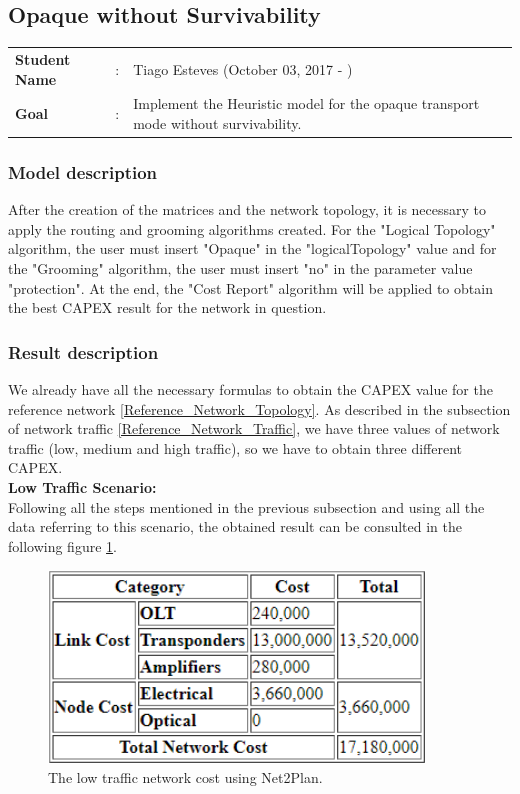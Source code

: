 \clearpage

\subsection{Opaque without Survivability}\label{heuristic_Opaque_Survivability}
\begin{tcolorbox}	
\begin{tabular}{p{2.75cm} p{0.2cm} p{10.5cm}} 	
\textbf{Student Name}  &:& Tiago Esteves    (October 03, 2017 - )\\
\textbf{Goal}          &:& Implement the Heuristic model for the opaque transport mode without survivability.
\end{tabular}
\end{tcolorbox}

\subsubsection{Model description}

After the creation of the matrices and the network topology, it is necessary to apply the routing and grooming algorithms created. For the "Logical Topology" algorithm, the user must insert "Opaque" in the "logicalTopology" value and for the "Grooming" algorithm, the user must insert "no" in the parameter value "protection".
At the end, the "Cost Report" algorithm will be applied to obtain the best CAPEX result for the network in question.

\subsubsection{Result description}

We already have all the necessary formulas to obtain the CAPEX value for the reference network \ref{Reference_Network_Topology}. As described in the subsection of network traffic \ref{Reference_Network_Traffic}, we have three values of network traffic (low, medium and high traffic), so we have to obtain three different CAPEX.\\

\textbf{Low Traffic Scenario:}\\

Following all the steps mentioned in the previous subsection and using all the data referring to this scenario, the obtained result can be consulted in the following figure \ref{Low_Network_Cost_Opaque}.

\begin{figure}[h!]
\centering
\includegraphics[width=10cm]{sdf/heuristic/figures/Low_Network_Cost_Opaque}
\caption{The low traffic network cost using Net2Plan.}
\label{Low_Network_Cost_Opaque}
\end{figure}

